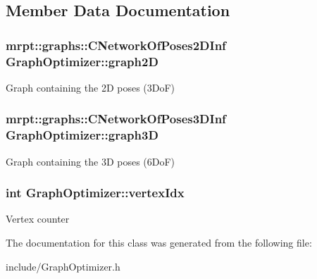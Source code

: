 \subsection{Member Data Documentation}
\hypertarget{classGraphOptimizer_af07abbef586789f8bbd42eec7744ee56}{
\subsubsection[{graph2\-D}]{\setlength{\rightskip}{0pt plus 5cm}mrpt\-::graphs\-::\-C\-Network\-Of\-Poses2\-D\-Inf Graph\-Optimizer\-::graph2\-D\hspace{0.3cm}{\ttfamily [private]}}}\label{classGraphOptimizer_af07abbef586789f8bbd42eec7744ee56}
Graph containing the 2\-D poses (3\-Do\-F) \hypertarget{classGraphOptimizer_a315fe25efae9c1e55723e225039a450b}{
\subsubsection[{graph3\-D}]{\setlength{\rightskip}{0pt plus 5cm}mrpt\-::graphs\-::\-C\-Network\-Of\-Poses3\-D\-Inf Graph\-Optimizer\-::graph3\-D\hspace{0.3cm}{\ttfamily [private]}}}\label{classGraphOptimizer_a315fe25efae9c1e55723e225039a450b}
Graph containing the 3\-D poses (6\-Do\-F) \hypertarget{classGraphOptimizer_afebac94ac7869590cf4e7503d362b9a9}{
\subsubsection[{vertex\-Idx}]{\setlength{\rightskip}{0pt plus 5cm}int Graph\-Optimizer\-::vertex\-Idx\hspace{0.3cm}{\ttfamily [private]}}}\label{classGraphOptimizer_afebac94ac7869590cf4e7503d362b9a9}
Vertex counter 

The documentation for this class was generated from the following file\-:\begin{DoxyCompactItemize}
\item 
include/Graph\-Optimizer.\-h\end{DoxyCompactItemize}
